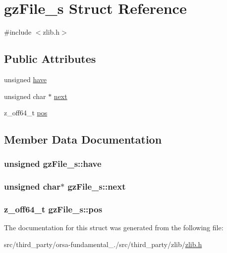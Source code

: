 \hypertarget{structgzFile__s}{}\section{gz\+File\+\_\+s Struct Reference}
\label{structgzFile__s}


{\ttfamily \#include $<$zlib.\+h$>$}

\subsection*{Public Attributes}
\begin{DoxyCompactItemize}
\item 
unsigned \hyperlink{structgzFile__s_abb96e208e17a991c09b4df6cefcc1c04}{have}
\item 
unsigned char $\ast$ \hyperlink{structgzFile__s_a8c1f4682372cc228f4e37bf7f95870a8}{next}
\item 
z\+\_\+off64\+\_\+t \hyperlink{structgzFile__s_a98038b7edb4ab55ee321fa388afb687e}{pos}
\end{DoxyCompactItemize}


\subsection{Member Data Documentation}
\hypertarget{structgzFile__s_abb96e208e17a991c09b4df6cefcc1c04}{}
\subsubsection[{have}]{\setlength{\rightskip}{0pt plus 5cm}unsigned gz\+File\+\_\+s\+::have}\label{structgzFile__s_abb96e208e17a991c09b4df6cefcc1c04}
\hypertarget{structgzFile__s_a8c1f4682372cc228f4e37bf7f95870a8}{}
\subsubsection[{next}]{\setlength{\rightskip}{0pt plus 5cm}unsigned char$\ast$ gz\+File\+\_\+s\+::next}\label{structgzFile__s_a8c1f4682372cc228f4e37bf7f95870a8}
\hypertarget{structgzFile__s_a98038b7edb4ab55ee321fa388afb687e}{}
\subsubsection[{pos}]{\setlength{\rightskip}{0pt plus 5cm}z\+\_\+off64\+\_\+t gz\+File\+\_\+s\+::pos}\label{structgzFile__s_a98038b7edb4ab55ee321fa388afb687e}


The documentation for this struct was generated from the following file\+:\begin{DoxyCompactItemize}
\item 
src/third\+\_\+party/orsa-\/fundamental\+\_./src/third\+\_\+party/zlib/\hyperlink{zlib_8h}{zlib.\+h}\end{DoxyCompactItemize}
